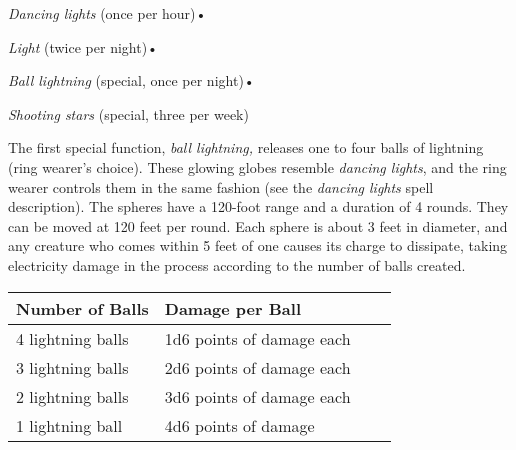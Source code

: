 \textit{Dancing lights }(once per hour)•

\textit{Light }(twice per night)•

\textit{Ball lightning }(special, once per night)•

\textit{Shooting stars }(special, three per week)

The first special function, \textit{ball lightning, }releases one to four balls 
of lightning (ring wearer's choice). These glowing globes resemble \textit{dancing 
lights}, and the ring wearer controls them in the same fashion (see the \textit{dancing 
lights }spell description). The spheres have a 120-foot range and a duration of 
4 rounds. They can be moved at 120 feet per round. Each sphere is about 3 feet 
in diameter, and any creature who comes within 5 feet of one causes its charge 
to dissipate, taking electricity damage in the process according to the number 
of balls created.

\begin{longtable}{llll}
\hline
\multicolumn{1}{|p{1.122in}|}{\begin{minipage}[t]{1.122in}\raggedright
\textbf{Number of Balls}\end{minipage}} & \multicolumn{1}{p{1.639in}|}{\begin{minipage}[t]{1.639in}\raggedright
\textbf{Damage per Ball}\end{minipage}}\\
\hline
\multicolumn{1}{p{0.069in}|}{\begin{minipage}[t]{0.069in}\raggedright
4 lightning balls\end{minipage}} & \multicolumn{1}{p{0.069in}|}{\begin{minipage}[t]{0.069in}\raggedright
1d6 points of damage each\end{minipage}}\\
\hline
\multicolumn{1}{|p{1.122in}|}{\begin{minipage}[t]{1.122in}\raggedright
3 lightning balls\end{minipage}} & \multicolumn{1}{p{1.639in}|}{\begin{minipage}[t]{1.639in}\raggedright
2d6 points of damage each\end{minipage}}\\
\hline
\multicolumn{1}{p{0.069in}|}{\begin{minipage}[t]{0.069in}\raggedright
2 lightning balls\end{minipage}} & \multicolumn{1}{p{0.069in}|}{\begin{minipage}[t]{0.069in}\raggedright
3d6 points of damage each\end{minipage}}\\
\hline
\multicolumn{1}{|p{1.122in}|}{\begin{minipage}[t]{1.122in}\raggedright
1 lightning ball\end{minipage}} & \multicolumn{3}{p{1.778in}|}{\begin{minipage}[t]{1.778in}\raggedright
4d6 points of damage\end{minipage}}\\
\hline
\end{longtable}

